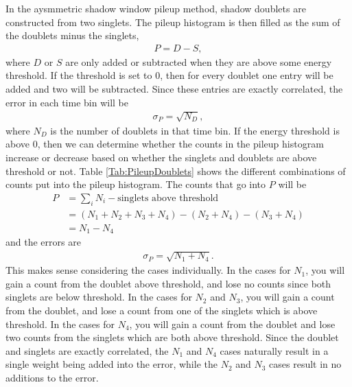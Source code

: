 In the aysmmetric shadow window pileup method, shadow doublets are constructed from two singlets. The pileup histogram is then filled as the sum of the doublets minus the singlets,
 	\begin{align}
 		P = D - S,
	\end{align}
where $D$ or $S$ are only added or subtracted when they are above some energy threshold. If the threshold is set to 0, then for every doublet one entry will be added and two will be subtracted. Since these entries are exactly correlated, the error in each time bin will be 
 	\begin{align}
 		\sigma_{P} = \sqrt{N_{D}},
	\end{align}
where $N_{D}$ is the number of doublets in that time bin. If the energy threshold is above 0, then we can determine whether the counts in the pileup histogram increase or decrease based on whether the singlets and doublets are above threshold or not. Table \ref{Tab:PileupDoublets} shows the different combinations of counts put into the pileup histogram. The counts that go into $P$ will be
	\begin{equation}	
	\begin{aligned}
 		P &= \sum_{i}N_{i} - \text{singlets above threshold} \\
 		  &= (N_{1} + N_{2} + N_{3} + N_{4}) - (N_{2} + N_{4}) - (N_{3} + N_{4}) \\
 		  &= N_{1} - N_{4}
	\end{aligned}
	\end{equation}
and the errors are 
 	\begin{align}
 		\sigma_{P} = \sqrt{N_{1} + N_{4}}.
	\end{align}
This makes sense considering the cases individually. In the cases for $N_{1}$, you will gain a count from the doublet above threshold, and lose no counts since both singlets are below threshold. In the cases for $N_{2}$ and $N_{3}$, you will gain a count from the doublet, and lose a count from one of the singlets which is above threshold. In the cases for $N_{4}$, you will gain a count from the doublet and lose two counts from the singlets which are both above threshold. Since the doublet and singlets are exactly correlated, the $N_{1}$ and $N_{4}$ cases naturally result in a single weight being added into the error, while the $N_{2}$ and $N_{3}$ cases result in no additions to the error.


